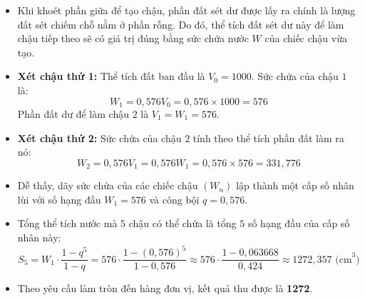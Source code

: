 \documentclass[12pt,a4paper]{article}
\begin{document}
\begin{ex}
{\begin{apdungbox}
\begin{itemize}
    \item Khi khoét phần giữa để tạo chậu, phần đất sét dư được lấy ra chính là lượng đất sét chiếm chỗ nằm ở phần rỗng. Do đó, thể tích đất sét dư này để làm chậu tiếp theo sẽ có giá trị đúng bằng sức chứa nước $W$ của chiếc chậu vừa tạo.
    \item \textbf{Xét chậu thứ 1:} 
    Thể tích đất ban đầu là $V_0 = 1000$. Sức chứa của chậu $1$ là:
    \[ W_1 = 0{,}576 V_0 = 0{,}576 \times 1000 = 576 \]
    Phần đất dư để làm chậu $2$ là $V_1 = W_1 = 576$.
    
    \item \textbf{Xét chậu thứ 2:} 
    Sức chứa của chậu $2$ tính theo thể tích phần đất làm ra nó:
    \[ W_2 = 0{,}576 V_1 = 0{,}576 W_1 = 0{,}576 \times 576 = 331{,}776 \]
    
    \item Dễ thấy, dãy sức chứa của các chiếc chậu $(W_n)$ lập thành một cấp số nhân lùi với số hạng đầu $W_1 = 576$ và công bội $q = 0{,}576$.
    \item Tổng thể tích nước mà $5$ chậu có thể chứa là tổng $5$ số hạng đầu của cấp số nhân này:
    \[ S_5 = W_1 \cdot \dfrac{1 - q^5}{1 - q} = 576 \cdot \dfrac{1 - (0{,}576)^5}{1 - 0{,}576} \approx 576 \cdot \dfrac{1 - 0{,}063668}{0{,}424} \approx 1272{,}357 \text{ (cm}^3) \]
    \item Theo yêu cầu làm tròn đến hàng đơn vị, kết quả thu được là \textbf{1272}.
\end{itemize}
\end{apdungbox}
}
\end{ex}
\end{document}
